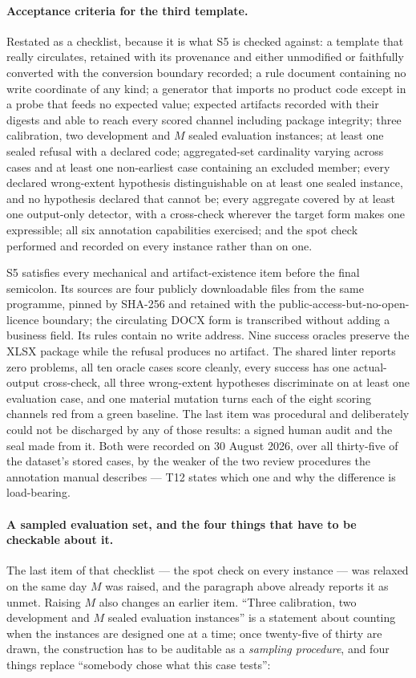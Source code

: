 \paragraph{Acceptance criteria for the third template.}
Restated as a checklist, because it is what S5 is checked against: a
template that really circulates, retained with its provenance and either unmodified or
faithfully converted with the conversion boundary recorded; a rule document
containing no write coordinate of any kind; a generator that imports no product code except in
a probe that feeds no expected value; expected artifacts recorded with their digests and able
to reach every scored channel including package integrity; three calibration, two development
and $M$ sealed evaluation instances; at least one sealed refusal with a declared code;
aggregated-set cardinality varying across cases and at least one non-earliest case containing
an excluded member; every declared wrong-extent hypothesis distinguishable on at least one
sealed instance, and no hypothesis declared that cannot be; every aggregate covered by at least
one output-only detector, with a cross-check wherever the target form makes one expressible;
all six annotation capabilities exercised; and the spot check performed and recorded on every
instance rather than on one.

S5 satisfies every mechanical and artifact-existence item before the final semicolon. Its
sources are four publicly downloadable files from the same programme, pinned by SHA-256 and
retained with the public-access-but-no-open-licence boundary; the circulating DOCX form is
transcribed without adding a business field. Its rules contain no write address. Nine success
oracles preserve the XLSX package while the refusal produces no artifact. The shared linter
reports zero problems, all ten oracle cases score cleanly, every success has one actual-output
cross-check, all three wrong-extent hypotheses discriminate on at least one evaluation case,
and one material mutation turns each of the eight scoring channels red from a green baseline.
The last item was procedural and deliberately could not be discharged by any of those
results: a signed human audit and the seal made from it. Both were recorded on 30 August
2026, over all thirty-five of the dataset's stored cases, by the weaker of the two review
procedures the annotation manual describes --- T12 states which one and why the difference
is load-bearing.

\paragraph{A sampled evaluation set, and the four things that have to be checkable about it.}
The last item of that checklist --- the spot check on every instance --- was relaxed on the
same day $M$ was raised, and the paragraph above already reports it as unmet. Raising $M$ also
changes an earlier item. ``Three calibration, two development and $M$ sealed evaluation
instances'' is a statement about counting when the instances are designed one at a time; once
twenty-five of thirty are drawn, the construction has to be auditable as a \emph{sampling
procedure}, and four things replace ``somebody chose what this case tests'':

